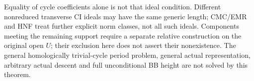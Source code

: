 Equality of cycle coefficients alone is not that ideal
condition.  Different nonreduced transverse CI ideals may
have the same generic length; CMC/EMR and HNF treat further
explicit norm classes, not all such ideals.  Components
meeting the remaining support require a separate relative
construction on the original open $U$; their exclusion here
does not assert their nonexistence.  The general homologically
trivial-cycle period problem, general actual representation,
arbitrary actual descent and full unconditional BB height
are not solved by this theorem.
